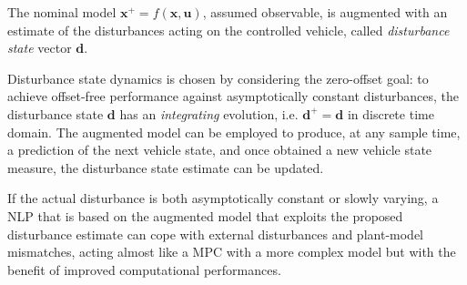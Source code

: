 \documentclass[conference]{IEEEtran} %
\renewcommand{\vec}[1]{\boldsymbol{#1}}
\begin{document}
The nominal model $\vec x^+=f(\vec x, \vec u)$, assumed observable, is augmented with an estimate of the disturbances acting on the controlled vehicle, called \emph{disturbance state} vector $\vec d$.

Disturbance state dynamics is chosen by considering the zero-offset goal: to achieve offset-free performance against asymptotically constant disturbances, the disturbance state $\vec d$ has an \emph{integrating} evolution, i.e. $\vec d^+ = \vec d$ in discrete time domain.
The augmented model can be employed to produce, at any sample time, a prediction of the next vehicle state, and once obtained a new vehicle state measure, the disturbance state estimate can be updated.

If the actual disturbance is both asymptotically constant or slowly varying, a NLP that is based on the augmented model that exploits the proposed disturbance estimate can cope with external disturbances and plant-model mismatches, acting almost like a MPC with a more complex model but with the benefit of improved computational performances.


\end{document}
